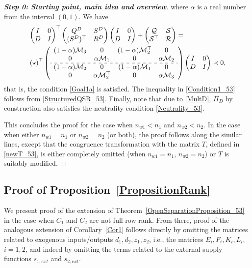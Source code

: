 \documentclass[11pt,a4paper,oneside,DIV=12,headings=small]{scrartcl}
\newcommand{\cS}{\mathcal{S}}
\newcommand{\cQ}{\mathcal{Q}}
\newcommand{\cM}{\mathcal{M}}
\newcommand{\cR}{\mathcal{R}}
\theoremstyle{plain}
\begin{document}
\begin{proof}[\textbf{Step 0: \emph{Starting point, main idea and overview}}]
where $\alpha$ is a real number from the interval $(0,1)$. We have 
\begin{align}
&\begin{pmatrix} I & 0 \\ D & I \end{pmatrix}^\top
\begin{pmatrix} Q^D & S^D \\ (S^D)^\top & R^D \end{pmatrix}
\begin{pmatrix} I & 0 \\ D & I \end{pmatrix}
+
\begin{pmatrix} \cQ & \cS \\ \cS^\top & \cR \end{pmatrix} = \nonumber\\
&\left( \star \right)^\top
\left( \begin{array}{c c : c c} 
(1-\alpha)\cM_3 & 0 & (1-\alpha)\cM_2^\top & 0 \\ 
0 & \alpha\cM_1 & 0 & \alpha\cM_2 \\ \hdashline
(1-\alpha)\cM_2 & 0 & (1-\alpha)\cM_1 & 0 \\
0 & \alpha\cM_2^\top & 0 & \alpha\cM_3 
\end{array} \right)
\begin{pmatrix} I & 0 \\ D & I \end{pmatrix} \prec 0, \label{Condition1_53}
\end{align}
that is, the condition \eqref{Goal1a} is satisfied. The inequality in \eqref{Condition1_53} follows from \eqref{StructuredQSR_53}. 
Finally, note that due to \eqref{MultD}, $\Pi_D$ by construction also satisfies the neutrality condition \eqref{Neutrality_53}. 

This concludes the proof for the case when $n_{w1} < n_1$ and $n_{w2} < n_2$. In the case when either $n_{w1}=n_1$ or $n_{w2}=n_2$ (or both), the proof follows along the similar lines, except that the congruence transformation with the matrix $T$, defined in \eqref{newT_53}, is either completely omitted (when $n_{w1}=n_1$, $n_{w2}=n_2$) or $T$ is suitably modified. 
\end{proof}

\subsection{Proof of Proposition~\ref{PropositionRank}}
\label{Sec6_B}
We present proof of the extension of Theorem~\ref{OpenSeparationProposition_53} in the case when $C_1$ and $C_2$ are not full row rank. From there, proof of the analogous extension of Corollary~\ref{Cor1} follows directly by omitting the matrices related to exogenous inputs/outputs $d_1, d_2, z_1, z_2$, i.e., the matrices  $E_i, F_i, K_i, L_i$, $i=1,2$, and indeed by omitting the terms related to the external supply functions $s_{1,ext}$ and $s_{2,ext}$. 
\end{document}
